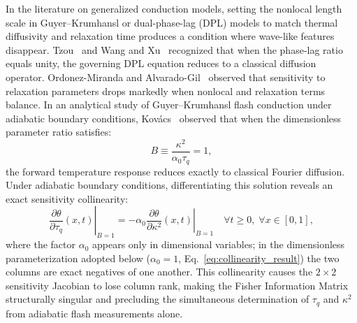 \documentclass[preprint,12pt]{elsarticle}
\begin{document}
In the literature on generalized conduction models, setting the nonlocal length scale in Guyer--Krumhansl or dual-phase-lag (DPL) models to match thermal diffusivity and relaxation time produces a condition where wave-like features disappear. Tzou~\cite{tzou1995unified,tzou1997macro} and Wang and Xu~\cite{wang2002thermal,wang2001wellposedness} recognized that when the phase-lag ratio equals unity, the governing DPL equation reduces to a classical diffusion operator. Ordonez-Miranda and Alvarado-Gil~\cite{ordonez2010determination} observed that sensitivity to relaxation parameters drops markedly when nonlocal and relaxation terms balance. In an analytical study of Guyer--Krumhansl flash conduction under adiabatic boundary conditions, Kov{\'a}cs~\cite{kovacs2018analytic} observed that when the dimensionless parameter ratio satisfies:
\begin{equation}
B \equiv \frac{\kappa^2}{\alpha_0 \tau_q} = 1,
\label{eq:b_ratio_def}
\end{equation}
the forward temperature response reduces exactly to classical Fourier diffusion. Under adiabatic boundary conditions, differentiating this solution reveals an exact sensitivity collinearity:
\begin{equation}
\left. \frac{\partial \theta}{\partial \tau_q}(x, t) \right|_{B=1} = -\alpha_0 \left. \frac{\partial \theta}{\partial \kappa^2}(x, t) \right|_{B=1} \quad \forall t \ge 0, \; \forall x \in [0, 1],
\label{eq:collinearity_intro}
\end{equation}
where the factor $\alpha_0$ appears only in dimensional variables; in the dimensionless parameterization adopted below ($\alpha_0 = 1$, Eq.~\eqref{eq:collinearity_result}) the two columns are exact negatives of one another. This collinearity causes the $2 \times 2$ sensitivity Jacobian to lose column rank, making the Fisher Information Matrix structurally singular and precluding the simultaneous determination of $\tau_q$ and $\kappa^2$ from adiabatic flash measurements alone.
\end{document}
